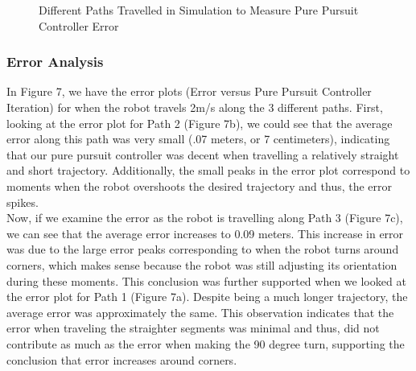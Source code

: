 \documentclass{article}
\begin{document}
\begin{figure}[h]
\begin{center}
\begin{tabular}{c|c|c}
\end{tabular}
\caption{Different Paths Travelled in Simulation to Measure Pure Pursuit Controller Error}
\end{center}
\end{figure}

\subsubsection{Error Analysis}

In Figure 7, we have the error plots (Error versus Pure Pursuit Controller Iteration) for when the robot travels 2m/s along the 3 different paths. First, looking at the error plot for Path 2 (Figure 7b), we could see that the average error along this path was very small (.07 meters, or 7 centimeters), indicating that our pure pursuit controller was decent when travelling a relatively straight and short trajectory. Additionally, the small peaks in the error plot correspond to moments when the robot overshoots the desired trajectory and thus, the error spikes. \\

Now, if we examine the error as the robot is travelling along Path 3 (Figure 7c), we can see that the average error increases to 0.09 meters. This increase in error was due to the large error peaks corresponding to when the robot turns around corners, which makes sense because the robot was still adjusting its orientation during these moments. This conclusion was further supported when we looked at the error plot for Path 1 (Figure 7a). Despite being a much longer trajectory, the average error was approximately the same. This observation indicates that the error when traveling the straighter segments was minimal and thus, did not contribute as much as the error when making the 90 degree turn, supporting the conclusion that error increases around corners.\\
\end{document}
